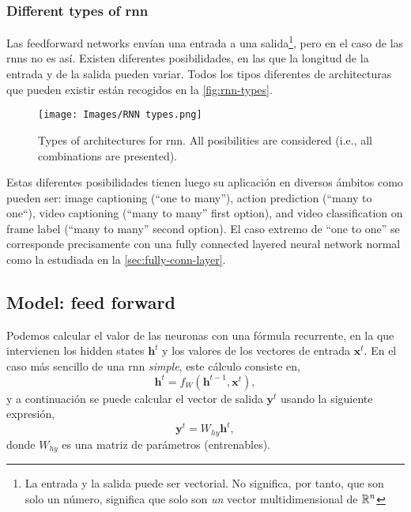 \subsubsection{Different types of \gls*{rnn}}
Las feedforward networks envían una entrada a una salida\footnote{La entrada y
  la salida puede ser vectorial. No significa, por tanto, que son solo un
  número, significa que solo son \emph{un} vector multidimensional de
  \(\mathbb{R}^n\)}, pero en el caso de las \glspl{rnn} no es así. Existen diferentes
posibilidades, en las que la longitud de la entrada y de la salida pueden
variar. Todos los tipos diferentes de architecturas que pueden existir están
recogidos en la \vref{fig:rnn-types}.

\begin{figure}[ht]
  \centering
  \texttt{[image: Images/RNN types.png]}
  \caption[Types of architectures for \acl*{rnn}]{Types of architectures
    for \gls{rnn}. All posibilities are considered (i.e., all combinations are
    presented).}
  \label{fig:rnn-types}
\end{figure}

Estas diferentes posibilidades tienen luego su aplicación en diversos ámbitos
como pueden ser: image captioning (``one to many''), action prediction (``many
to one``), video captioning (``many to many'' first option), and video
classification on frame label (``many to many'' second option). El caso extremo
de ``one to one'' se corresponde precisamente con una fully connected layered
neural network normal como la estudiada en la \vref{sec:fully-conn-layer}.

\subsection{Model: feed forward}

Podemos calcular el valor de las neuronas con una fórmula recurrente, en la que
intervienen los hidden states \(\mathbf{h}^t\) y los valores de los vectores de
entrada \(\mathbf{x}^t\). En el caso más sencillo de una \gls{rnn}
\emph{simple}, este cálculo consiste en,
\begin{equation} \label{eq:rnn-hidden}
  \mathbf{h}^t = f_{W} (\mathbf{h}^{t - 1}, \mathbf{x}^t),
\end{equation}
y a continuación se puede calcular el vector de salida \(\mathbf{y}^t\) usando
la siguiente expresión,
\begin{equation} \label{eq:rnn-out}
  \mathbf{y}^t = W_{hy}\mathbf{h}^t,
\end{equation}
donde \(W_{hy}\) es una matriz de parámetros (entrenables).

